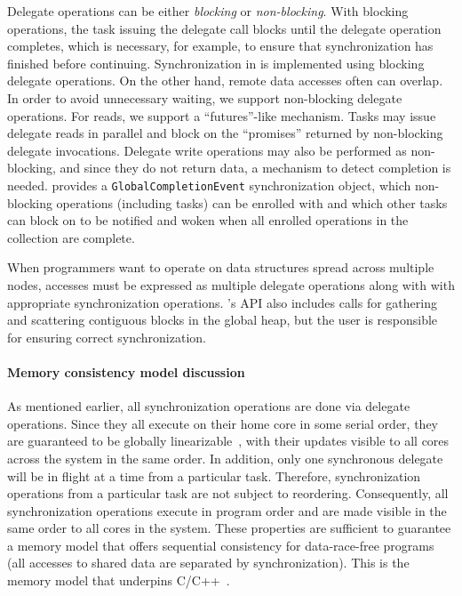 Delegate operations can be either {\em blocking} or {\em non-blocking}.
With blocking operations, the task issuing the delegate call blocks until
the delegate operation completes, which is necessary, for example, to ensure
that synchronization has finished before continuing. Synchronization in \Grappa
is implemented using blocking delegate operations. On the other hand, remote data
accesses often can overlap. In order to avoid
unnecessary waiting, we support non-blocking delegate operations. For reads,
we support a ``futures''-like mechanism. Tasks may issue delegate reads in
parallel and block on the ``promises'' returned by non-blocking delegate
invocations. Delegate write operations may also be performed as
non-blocking,
and since they do not return data, a mechanism to detect completion is needed.
\Grappa provides a \texttt{GlobalCompletionEvent} synchronization object, which non-blocking operations (including tasks) can be enrolled with and which other tasks can block on to be notified and woken when all enrolled operations in the collection are complete.

When programmers want to operate on data structures spread across
multiple nodes, accesses must be expressed as multiple delegate
operations along with with appropriate synchronization
operations. \Grappa's API also includes calls for gathering and scattering
contiguous blocks in the global heap, but the user is responsible for
ensuring correct synchronization.

\paragraph{Memory consistency model discussion} As mentioned earlier, all
synchronization operations are done via delegate operations. Since they all
execute on their home core in some serial order, they are guaranteed to be globally linearizable~\cite{herlihy1990linearizability}, with their
updates visible to all cores across the system in the same order. In addition, only one synchronous delegate will be in flight at a time from a particular task. Therefore, synchronization operations from a particular task are not subject to reordering. 
Consequently, all synchronization operations execute in program order and are
made visible in the same order to all cores in the system. These properties
are sufficient to guarantee a memory model that offers sequential consistency
for data-race-free programs~\cite{AdveHill1990} (all accesses to shared data
are separated by synchronization). This is the memory model that underpins
C/C++~\cite{N2480,N2800}.

